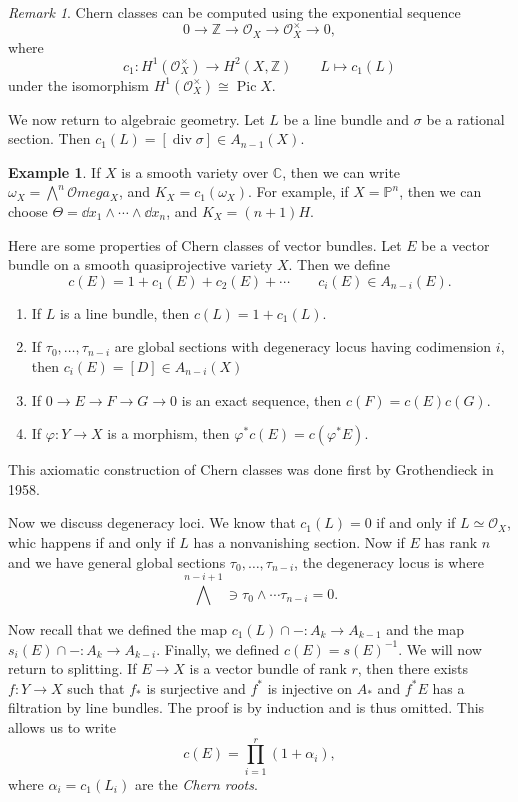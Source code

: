 \documentclass[leqno, openany]{memoir}
\theoremstyle{definition}
\newtheorem{exm}[thm]{Example}
\theoremstyle{remark}
\newtheorem{rmk}[thm]{Remark}
\theoremstyle{plain}
\theoremstyle{definition}
\theoremstyle{remark}
\newcommand{\C}{\mathbb{C}}
\newcommand{\Z}{\mathbb{Z}}
\renewcommand{\P}{\mathbb{P}}
\newcommand{\msc}[1]{\mathscr{#1}}
\renewcommand{\div}{\operatorname{div}}
\DeclareMathOperator{\Pic}{Pic}
\begin{document}
\begin{rmk}
    Chern classes can be computed using the exponential sequence 
    \[ 0 \to \Z \to \msc{O}_X \to \msc{O}_X^{\times} \to 0, \] 
    where
    \[ c_1 \colon H^1(\msc{O}_X^{\times}) \to H^2(X, \Z) \qquad L \mapsto c_1(L) \]
    under the isomorphism $H^1(\msc{O}_X^{\times}) \cong \Pic X$.
\end{rmk}

We now return to algebraic geometry. Let $L$ be a line bundle and $\sigma$ be a rational section. Then $c_1(L) = [\div \sigma] \in A_{n-1}(X)$.

\begin{exm}
    If $X$ is a smooth variety over $\C$, then we can write $\omega_X = \bigwedge^n \msc{O}mega_X$, and $K_X = c_1(\omega_X)$. For example, if $X = \P^n$, then we can choose $\Theta = \dd{x_1} \wedge \cdots \wedge \dd{x_n}$, and $K_X = (n+1)H$.
\end{exm}

Here are some properties of Chern classes of vector bundles. Let $E$ be a vector bundle on a smooth quasiprojective variety $X$. Then we define
\[ c(E) = 1 + c_1(E) + c_2(E) + \cdots \qquad c_i(E) \in A_{n-i}(E). \]
\begin{enumerate}
    \item If $L$ is a line bundle, then $c(L) = 1 + c_1(L)$.
    \item If $\tau_0, \ldots, \tau_{n-i}$ are global sections with degeneracy locus having codimension $i$, then $c_i(E) = [D] \in A_{n-i}(X)$
    \item If $0 \to E \to F \to G \to 0$ is an exact sequence, then $c(F) = c(E) c(G)$.
    \item If $\varphi \colon Y \to X$ is a morphism, then $\varphi^* c(E) = c(\varphi^* E)$.
\end{enumerate}
This axiomatic construction of Chern classes was done first by Grothendieck in 1958.

Now we discuss degeneracy loci. We know that $c_1(L) = 0$ if and only if $L \simeq \msc{O}_X$, whic happens if and only if $L$ has a nonvanishing section. Now if $E$ has rank $n$ and we have general global sections $\tau_0, \ldots, \tau_{n-i}$, the degeneracy locus is where
\[ {\bigwedge}^{n-i+1} \ni \tau_0 \wedge \cdots \tau_{n-i} = 0. \]

Now recall that we defined the map $c_1(L) \cap - \colon A_k \to A_{k-1}$ and the map $s_i(E) \cap - \colon A_k \to A_{k-i}$. Finally, we defined $c(E) = {s(E)}^{-1}$. We will now return to splitting. If $E \to X$ is a vector bundle of rank $r$, then there exists $f \colon Y \to X$ such that $f_*$ is surjective and $f^*$ is injective on $A_*$ and $f^* E$ has a filtration by line bundles. The proof is by induction and is thus omitted. This allows us to write 
\[ c(E) = \prod_{i=1}^r (1 + \alpha_i), \]
where $\alpha_i = c_1(L_i)$ are the \textit{Chern roots}.
\end{document}

